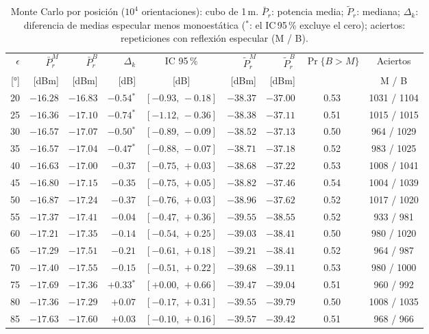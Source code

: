 \documentclass[11pt,a4paper]{report}
\newcommand{\sig}{$^{\ast}$}
\begin{document}
\begin{table}[H]
\centering
\caption{Monte Carlo por posición ($10^4$ orientaciones): cubo de 1\,m. $\bar P_r$: potencia media; $\tilde P_r$: mediana; $\Delta_k$: diferencia de medias especular menos monoestática ($^{\ast}$: el IC\,95\,\% excluye el cero); aciertos: repeticiones con reflexión especular (M / B).}
\label{tab:cubo_mc}
\small
\setlength{\tabcolsep}{4pt}
\begin{tabular}{@{}rrrrcrrcc@{}}
\toprule
$\epsilon$ & $\bar P_r^M$ & $\bar P_r^B$ & $\Delta_k$ & IC 95\,\% & $\tilde P_r^M$ & $\tilde P_r^B$ & $\Pr\{B>M\}$ & Aciertos \\
{[°]} & [dBm] & [dBm] & [dB] & [dB] & [dBm] & [dBm] & & M / B \\
\midrule
20 & $-16.28$ & $-16.83$ & $-0.54$\sig & $[-0.93,\,-0.18]$ & $-38.37$ & $-37.00$ & 0.53 & 1031 / 1104 \\
25 & $-16.36$ & $-17.10$ & $-0.74$\sig & $[-1.12,\,-0.36]$ & $-38.38$ & $-37.11$ & 0.51 & 1015 / 1015 \\
30 & $-16.57$ & $-17.07$ & $-0.50$\sig & $[-0.89,\,-0.09]$ & $-38.52$ & $-37.13$ & 0.50 & 964 / 1029 \\
35 & $-16.57$ & $-17.04$ & $-0.47$\sig & $[-0.88,\,-0.07]$ & $-38.71$ & $-37.18$ & 0.52 & 983 / 1025 \\
40 & $-16.63$ & $-17.00$ & $-0.37$ & $[-0.75,\,+0.03]$ & $-38.68$ & $-37.22$ & 0.53 & 1008 / 1041 \\
45 & $-16.80$ & $-17.15$ & $-0.35$ & $[-0.75,\,+0.05]$ & $-38.82$ & $-37.46$ & 0.54 & 1004 / 1039 \\
50 & $-16.87$ & $-17.24$ & $-0.37$ & $[-0.76,\,+0.03]$ & $-38.96$ & $-37.62$ & 0.52 & 1017 / 1020 \\
55 & $-17.37$ & $-17.41$ & $-0.04$ & $[-0.47,\,+0.36]$ & $-39.55$ & $-38.55$ & 0.52 & 933 / 981 \\
60 & $-17.21$ & $-17.35$ & $-0.14$ & $[-0.54,\,+0.25]$ & $-39.03$ & $-38.41$ & 0.50 & 980 / 1020 \\
65 & $-17.29$ & $-17.51$ & $-0.21$ & $[-0.61,\,+0.18]$ & $-39.21$ & $-38.41$ & 0.52 & 964 / 987 \\
70 & $-17.40$ & $-17.55$ & $-0.15$ & $[-0.51,\,+0.22]$ & $-39.68$ & $-39.11$ & 0.53 & 980 / 1000 \\
75 & $-17.69$ & $-17.36$ & $+0.33$\sig & $[+0.00,\,+0.66]$ & $-39.47$ & $-39.04$ & 0.51 & 960 / 992 \\
80 & $-17.36$ & $-17.29$ & $+0.07$ & $[-0.17,\,+0.31]$ & $-39.55$ & $-39.79$ & 0.50 & 1008 / 1035 \\
85 & $-17.63$ & $-17.60$ & $+0.03$ & $[-0.10,\,+0.16]$ & $-39.57$ & $-39.42$ & 0.51 & 968 / 966 \\
\bottomrule
\end{tabular}
\end{table}
\end{document}
